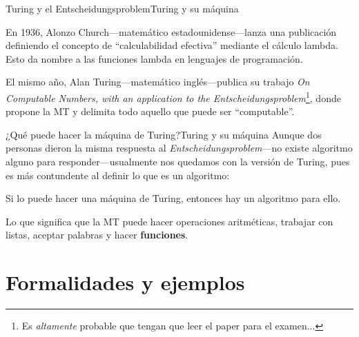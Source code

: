 \documentclass[spanish, handout]{beamer}
\begin{document}
\begin{frame}{Turing y el Entscheidungsproblem}{Turing y su máquina}

    En 1936, Alonzo Church---matemático estadounidense---lanza una publicación definiendo el concepto de ``calculabilidad efectiva'' mediante el cálculo lambda. Esto da nombre a las funciones lambda en lenguajes de programación. \pause

    \bigskip

    El mismo año, Alan Turing---matemático inglés---publica su trabajo \textit{On Computable Numbers, with an application to the Entscheidungsproblem}\footnote{Es \textit{altamente} probable que tengan que leer el paper para el examen...}, donde propone la MT y delimita todo aquello que puede ser ``computable''. \pause
    
\end{frame}

\begin{frame}{¿Qué puede hacer la máquina de Turing?}{Turing y su máquina}
    Aunque dos personas dieron la misma respuesta al \textit{Entscheidungsproblem}---no existe algoritmo alguno para responder---usualmente nos quedamos con la versión de Turing, pues es más contundente al definir lo que es un algoritmo: \pause

    \bigskip

    \begin{theorem}
        Si lo puede hacer una máquina de Turing, entonces hay un algoritmo para ello.
    \end{theorem} \pause

    \bigskip

    Lo que significa que la MT puede hacer operaciones aritméticas, trabajar con listas, aceptar palabras y hacer \textbf{funciones}. \pause

\end{frame}

\section{Formalidades y ejemplos}
\end{document}
